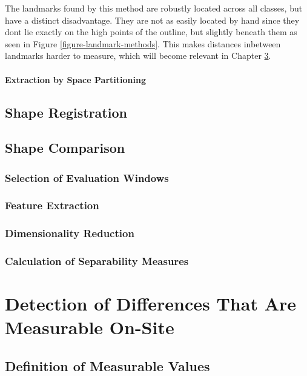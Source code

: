 \documentclass[pdftex,12pt,a4paper]{report}
\begin{document}
The landmarks found by this method are robustly located across all classes, but have a distinct disadvantage. They are
not as easily located by hand since they dont lie exactly on the high  points of the outline, but slightly beneath
them  as seen in Figure \ref{figure-landmark-methods}. This makes distances inbetween landmarks harder to measure, which
will become relevant in Chapter \ref{chapter:measurable-differences}.

\subsubsection{Extraction by Space Partitioning}

\section{Shape Registration}

\section{Shape Comparison}

\subsection{Selection of Evaluation Windows}

\subsection{Feature Extraction}

\subsection{Dimensionality Reduction}

\subsection{Calculation of Separability Measures}

\chapter{Detection of Differences That Are Measurable On-Site}
\label{chapter:measurable-differences}

\section{Definition of Measurable Values}
\end{document}
